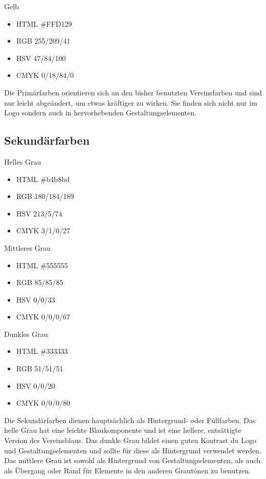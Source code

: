 \documentclass{article}
\begin{document}
\begin{samepage}
\cfield[LESYellow]
Gelb
\begin{itemize}
\item HTML \#FFD129
\item RGB 255/209/41
\item HSV 47/84/100
\item CMYK 0/18/84/0
\end{itemize}
\end{samepage}

Die Primärfarben orientieren sich an den bisher benutzten Vereinsfarben und sind nur leicht abgeändert, um etwas kräftiger zu wirken. Sie finden sich nicht nur im Logo sondern auch in hervorhebenden Gestaltungselementen.

\subsection{Sekundärfarben}
\begin{samepage}
\cfield[SECLight]
Helles Grau
\begin{itemize}
\item HTML \#b4b8bd
\item RGB 180/184/189
\item HSV 213/5/74
\item CMYK 3/1/0/27
\end{itemize}
\end{samepage}

\begin{samepage}
\cfield[SECMedium]
Mittleres Grau
\begin{itemize}
\item HTML \#555555
\item RGB 85/85/85
\item HSV 0/0/33
\item CMYK 0/0/0/67
\end{itemize}
\end{samepage}

\begin{samepage}
\cfield[SECDark]
Dunkles Grau
\begin{itemize}
\item HTML \#333333
\item RGB 51/51/51
\item HSV 0/0/20
\item CMYK 0/0/0/80
\end{itemize}
\end{samepage}

Die Sekundärfarben dienen hauptsächlich als Hintergrund- oder Füllfarben. Das helle Grau hat eine leichte Blaukomponente und ist eine hellere, entsättigte Version des Vereinsblaus. Das dunkle Grau bildet einen guten Kontrast du Logo und Gestaltungselementen und sollte für diese als Hintergrund verwendet werden. Das mittlere Grau ist sowohl als Hintergrund von Gestaltungselementen, als auch als Übergang oder Rand für Elemente in den anderen Grautönen zu benutzen.
\end{document}
